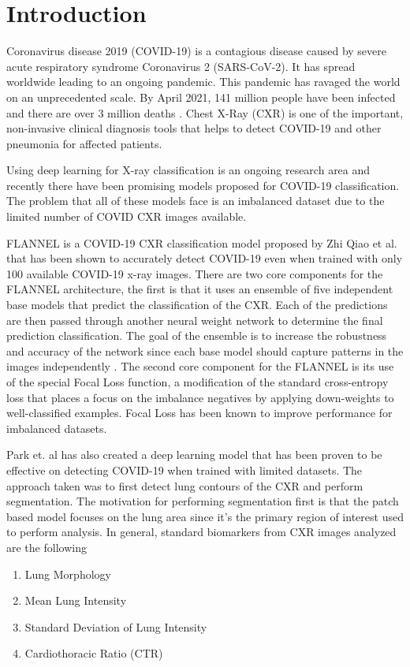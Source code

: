 \documentclass{sigkddExp}
\begin{document}
\section{Introduction}
Coronavirus disease 2019 (COVID-19) is a contagious disease caused by severe
acute respiratory syndrome Coronavirus 2 (SARS-CoV-2). It has spread worldwide
leading to an ongoing pandemic. This pandemic has ravaged the world on an
unprecedented scale. By April 2021, 141 million people have been infected and
there are over 3 million deaths \cite{whocovid1920-apr-21}. Chest X-Ray (CXR) is
one of the important, non-invasive clinical diagnosis tools that helps to detect
COVID-19 and other pneumonia for affected patients.

Using deep learning for X-ray classification is an ongoing research area and
recently there have been promising models proposed for COVID-19 classification.
The problem that all of these models face is an imbalanced dataset due to the
limited number of COVID CXR images available.

FLANNEL is a COVID-19 CXR classification model proposed by Zhi Qiao et al.
\cite{10.1093/jamia/ocaa280} that has been shown to accurately detect COVID-19
even when trained with only 100 available COVID-19 x-ray images. There are two
core components for the FLANNEL architecture, the first is that it uses an
ensemble \cite{58871} of five independent base models that predict the
classification of the CXR. Each of the predictions are then passed through
another neural weight network to determine the final prediction classification.
The goal of the ensemble is to increase the robustness and accuracy of the
network since each base model should capture patterns in the images
independently \cite{combine}. The second core component for the FLANNEL is its
use of the special Focal Loss \cite{lin2018focal} function, a modification of
the standard cross-entropy loss that places a focus on the imbalance negatives
by applying down-weights to well-classified examples. Focal Loss has been known
to improve performance for imbalanced datasets.

Park et. al \cite{pmid32396075} has also created a deep learning model that has
been proven to be effective on detecting COVID-19 when trained with limited
datasets. The approach taken was to first detect lung contours of the CXR and
perform segmentation. The motivation for performing segmentation first is that
the patch based model focuses on the lung area since it’s the primary region of
interest used to perform analysis.  In general, standard biomarkers
\cite{pmid32396075} from CXR images analyzed are the following
\begin{enumerate}
    \item Lung Morphology
    \item Mean Lung Intensity
    \item Standard Deviation of Lung Intensity
    \item Cardiothoracic Ratio (CTR)
\end{enumerate}
\end{document}
